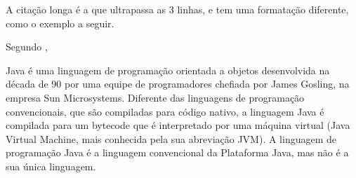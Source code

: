 \documentclass[12pt]{article}
\begin{document}
A citação longa é a que ultrapassa as 3 linhas, e tem uma formatação diferente, como o exemplo a seguir.

Segundo \cite{knuth:84},

\hfill
\begin{minipage}{10cm}
{\small

Java é uma linguagem de programação orientada a objetos desenvolvida na década de 90 por uma equipe de programadores chefiada por James Gosling, na empresa Sun Microsystems. Diferente das linguagens de programação convencionais, que são compiladas para código nativo, a linguagem Java é compilada para um bytecode que é interpretado por uma máquina virtual (Java Virtual Machine, mais conhecida pela sua abreviação JVM). A linguagem de programação Java é a linguagem convencional da Plataforma Java, mas não é a sua única linguagem.
\par}
\end{minipage}
\end{document}
